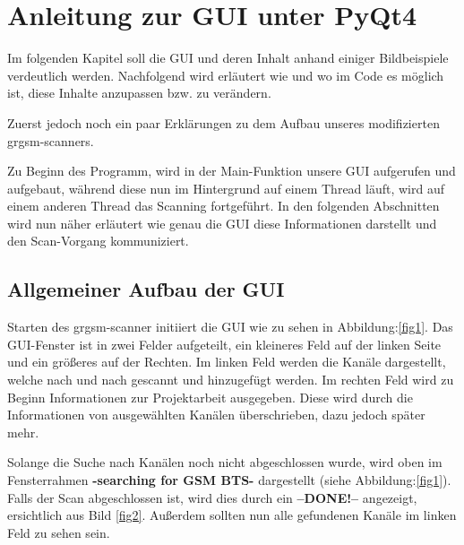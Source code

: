 
\chapter{Anleitung zur GUI unter PyQt4}

Im folgenden Kapitel soll die GUI und deren Inhalt anhand einiger Bildbeispiele verdeutlich werden.
Nachfolgend wird erläutert wie und wo im Code es möglich ist, diese Inhalte anzupassen bzw. zu verändern.

Zuerst jedoch noch ein paar Erklärungen zu dem Aufbau unseres modifizierten grgsm-scanners.

Zu Beginn des Programm, wird in der Main-Funktion unsere GUI aufgerufen und aufgebaut, während diese nun im Hintergrund auf einem Thread läuft, wird auf einem anderen Thread das Scanning fortgeführt.
In den folgenden Abschnitten wird nun näher erläutert wie genau die GUI diese Informationen darstellt und den Scan-Vorgang kommuniziert.

\section{Allgemeiner Aufbau der GUI}


Starten des grgsm-scanner initiiert die GUI wie zu sehen in Abbildung:\ref{fig1}.
Das GUI-Fenster ist in zwei Felder aufgeteilt, ein kleineres Feld auf der linken Seite
und ein größeres auf der Rechten.
Im linken Feld werden die Kanäle dargestellt, welche nach und nach gescannt und hinzugefügt werden.
Im rechten Feld wird zu Beginn Informationen zur Projektarbeit ausgegeben. Diese wird durch die Informationen von ausgewählten Kanälen überschrieben, dazu jedoch später mehr.


\noindent Solange die Suche nach Kanälen noch nicht abgeschlossen wurde, wird oben im Fensterrahmen \textbf{-searching for GSM BTS-} dargestellt (siehe Abbildung:\ref{fig1}).
Falls der Scan abgeschlossen ist, wird dies durch ein \textbf{--DONE!--} angezeigt, ersichtlich aus Bild \ref{fig2}. Außerdem sollten nun alle gefundenen Kanäle im linken Feld zu sehen sein.

%
%



